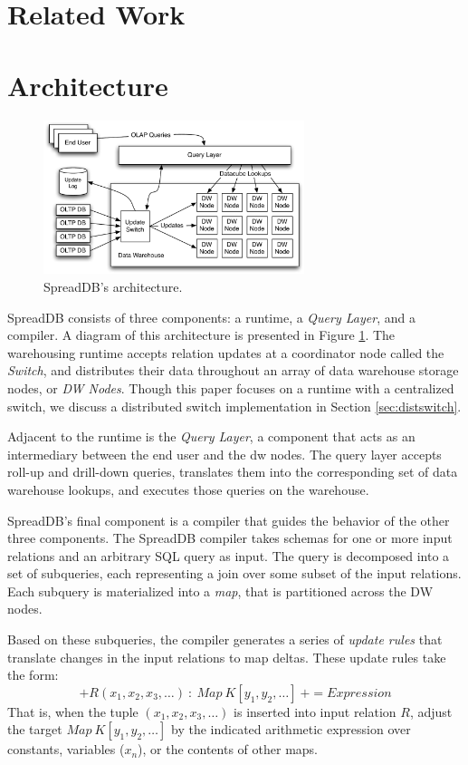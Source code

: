 \documentclass{sig-alternate}
\begin{document}
\section{Related Work}
\label{sec:relatedwork}

\section{Architecture}
\label{sec:architecture}
\begin{figure}
\begin{center}
\includegraphics[width=3in]{images/Architecture.pdf}
\caption{SpreadDB's architecture.}
\label{fig:arch}
\end{center}
\end{figure}
SpreadDB consists of three components: a runtime, a \textit{Query Layer}, and a compiler.  A diagram of this architecture is presented in Figure \ref{fig:arch}.  The warehousing runtime accepts relation updates at a coordinator node called the \textit{Switch}, and distributes their data throughout an array of data warehouse storage nodes, or \textit{DW Nodes}.  Though this paper focuses on a runtime with a centralized switch, we discuss a distributed switch implementation in Section \ref{sec:distswitch}.

Adjacent to the runtime is the \textit{Query Layer}, a component that acts as an intermediary between the end user and the dw nodes.  The query layer accepts roll-up and drill-down queries, translates them into the corresponding set of data warehouse lookups, and executes those queries on the warehouse.

SpreadDB's final component is a compiler that guides the behavior of the other three components.  The SpreadDB compiler takes schemas for one or more input relations and an arbitrary SQL query as input.  The query is decomposed into a set of subqueries, each representing a join over some subset of the input relations.  Each subquery is materialized into a \textit{map}, that is partitioned across the DW nodes.  

Based on these subqueries, the compiler generates a series of \textit{update rules} that translate changes in the input relations to map deltas.  These update rules take the form:
$$+R(x_1, x_2, x_3, \ldots)\ :\ Map\ K[y_1, y_2, \ldots]\ += Expression$$
That is, when the tuple $(x_1, x_2, x_3, \ldots)$ is inserted into input relation $R$, adjust the target $Map\ K[y_1, y_2, \ldots]$ by the indicated arithmetic expression over constants, variables ($x_n$), or the contents of other maps.  
 
\end{document}
